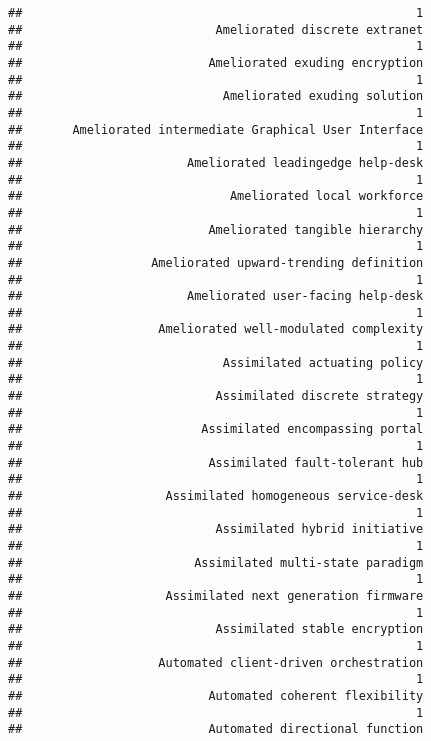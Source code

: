 \documentclass[
]{article}
\begin{document}
\begin{verbatim}
##                                                       1 
##                           Ameliorated discrete extranet 
##                                                       1 
##                          Ameliorated exuding encryption 
##                                                       1 
##                            Ameliorated exuding solution 
##                                                       1 
##       Ameliorated intermediate Graphical User Interface 
##                                                       1 
##                       Ameliorated leadingedge help-desk 
##                                                       1 
##                             Ameliorated local workforce 
##                                                       1 
##                          Ameliorated tangible hierarchy 
##                                                       1 
##                  Ameliorated upward-trending definition 
##                                                       1 
##                       Ameliorated user-facing help-desk 
##                                                       1 
##                   Ameliorated well-modulated complexity 
##                                                       1 
##                            Assimilated actuating policy 
##                                                       1 
##                           Assimilated discrete strategy 
##                                                       1 
##                         Assimilated encompassing portal 
##                                                       1 
##                          Assimilated fault-tolerant hub 
##                                                       1 
##                    Assimilated homogeneous service-desk 
##                                                       1 
##                           Assimilated hybrid initiative 
##                                                       1 
##                        Assimilated multi-state paradigm 
##                                                       1 
##                    Assimilated next generation firmware 
##                                                       1 
##                           Assimilated stable encryption 
##                                                       1 
##                   Automated client-driven orchestration 
##                                                       1 
##                          Automated coherent flexibility 
##                                                       1 
##                          Automated directional function 

\end{verbatim}
\end{document}
